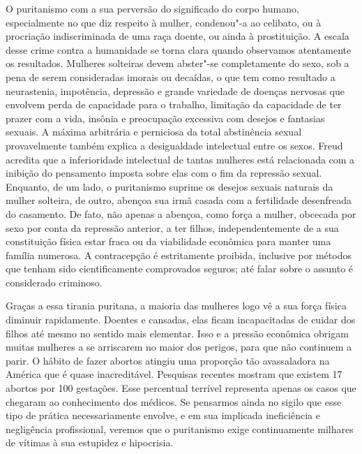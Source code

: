 O puritanismo com a sua perversão do significado do corpo humano,
especialmente no que diz respeito à mulher, condenou"-a ao celibato, ou à
procriação indiscriminada de uma raça doente, ou ainda à prostituição. A
escala desse crime contra a humanidade se torna clara quando observamos
atentamente os resultados. Mulheres solteiras devem abster"-se
completamente do sexo, sob a pena de serem consideradas imorais ou
decaídas, o que tem como resultado a neurastenia, impotência, depressão
e grande variedade de doenças nervosas que envolvem perda de capacidade
para o trabalho, limitação da capacidade de ter prazer com a vida,
insônia e preocupação excessiva com desejos e fantasias sexuais. A
máxima arbitrária e perniciosa da total abstinência sexual provavelmente
também explica a desigualdade intelectual entre os sexos. Freud acredita
que a inferioridade intelectual de tantas mulheres está relacionada com
a inibição do pensamento imposta sobre elas com o fim da repressão
sexual. Enquanto, de um lado, o puritanismo suprime os desejos sexuais
naturais da mulher solteira, de outro, abençoa sua irmã casada com a
fertilidade desenfreada do casamento. De fato, não apenas a abençoa,
como força a mulher, obcecada por sexo por conta da repressão anterior,
a ter filhos, independentemente de a sua constituição física estar fraca
ou da viabilidade econômica para manter uma família numerosa. A
contracepção é estritamente proibida, inclusive por métodos que tenham
sido cientificamente comprovados seguros; até falar sobre o assunto é
considerado criminoso.

Graças a essa tirania puritana, a maioria das mulheres logo vê a sua
força física diminuir rapidamente. Doentes e cansadas, elas ficam
incapacitadas de cuidar dos filhos até mesmo no sentido mais elementar.
Isso e a pressão econômica obrigam muitas mulheres a se arriscarem no
maior dos perigos, para que não continuem a parir. O hábito de fazer
abortos atingiu uma proporção tão avassaladora na América que é quase
inacreditável. Pesquisas recentes mostram que existem 17 abortos por 100
gestações. Esse percentual terrível representa apenas os casos que
chegaram ao conhecimento dos médicos. Se pensarmos ainda no sigilo que
esse tipo de prática necessariamente envolve, e em sua implicada %
ineficiência e negligência profissional, veremos que o puritanismo exige continuamente
milhares de vítimas à sua estupidez e hipocrisia.

